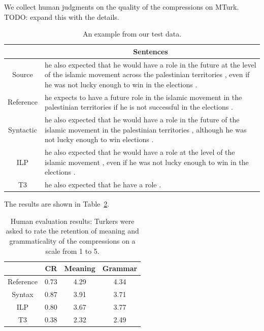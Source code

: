\documentclass[11pt]{article}
\begin{document}
We collect human judgments on the quality of the compressions on
MTurk. TODO: expand this with the details.

\begin{table}
\begin{center}
\begin{tabular}{|c|p{13.5cm}|}
  \hline
  & \multicolumn{1}{|c|}{Sentences}  \\
  \hline
  Source & he also expected that he would have a role in the future at
  the level of the islamic movement across the palestinian territories
  , even if he was not lucky enough to win in the elections . \\
  \hline
  Reference & he expects to have a future role in the islamic movement
  in the palestinian territories if he is not successful in the
  elections . \\
  \hline
  Syntactic & he also expected that he would have a role in the future
  of the islamic movement in the palestinian territories , although he
  was not lucky enough to win elections . \\
  \hline
  ILP & he also expected that he would have a role at the level of the
  islamic movement , even if he was not lucky enough to win in the
  elections . \\
  \hline
  T3 & he also expected that he have a role . \\
  \hline
\end{tabular}
\end{center}
\caption{An example from our test data.}
\label{test_examples}
\end{table}

The results are shown in Table~\ref{human_judgments}.

\begin{table}
\begin{center}
\begin{tabular}{|c|c|c|c|}
  \hline
  & CR & Meaning & Grammar \\
  \hline
  Reference & 0.73 &  4.29 & 4.34 \\
  Syntax & 0.87 & 3.91 & 3.71 \\
  ILP & 0.80 & 3.67 & 3.77 \\
  T3 & 0.38 & 2.32 & 2.49 \\
  \hline
\end{tabular}
\end{center}
\caption{Human evaluation results: Turkers were asked to rate the
 retention of meaning and grammaticality of the compressions on a
 scale from 1 to 5.}
\label{human_judgments}
\end{table}
\end{document}

